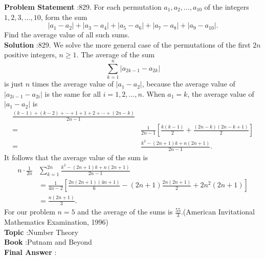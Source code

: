 \documentclass[10pt]{article}
\begin{document}
\textbf{Problem Statement} :829. For each permutation $a_{1}, a_{2}, \ldots, a_{10}$ of the integers $1,2,3, \ldots, 10$, form the sum$$ \left|a_{1}-a_{2}\right|+\left|a_{3}-a_{4}\right|+\left|a_{5}-a_{6}\right|+\left|a_{7}-a_{8}\right|+\left|a_{9}-a_{10}\right| . $$Find the average value of all such sums.\\
\textbf{Solution} :829. We solve the more general case of the permutations of the first $2 n$ positive integers, $n \geq 1$. The average of the sum$$ \sum_{k=1}^{n}\left|a_{2 k-1}-a_{2 k}\right| $$is just $n$ times the average value of $\left|a_{1}-a_{2}\right|$, because the average value of $\left|a_{2 i-1}-a_{2 i}\right|$ is the same for all $i=1,2, \ldots, n$. When $a_{1}=k$, the average value of $\left|a_{1}-a_{2}\right|$ is$$ \begin{aligned} \frac{(k-1)+(k-2)+\cdots+1+1+2+\cdots+(2 n-k)}{2 n-1} \\ =& \frac{1}{2 n-1}\left[\frac{k(k-1)}{2}+\frac{(2 n-k)(2 n-k+1)}{2}\right] \\ =& \frac{k^{2}-(2 n+1) k+n(2 n+1)}{2 n-1} . \end{aligned} $$It follows that the average value of the sum is$$ \begin{aligned} n \cdot \frac{1}{2 n} & \sum_{k=1}^{2 n} \frac{k^{2}-(2 n+1) k+n(2 n+1)}{2 n-1} \\ &=\frac{1}{4 n-2}\left[\frac{2 n(2 n+1)(4 n+1)}{6}-(2 n+1) \frac{2 n(2 n+1)}{2}+2 n^{2}(2 n+1)\right] \\ &=\frac{n(2 n+1)}{3} . \end{aligned} $$For our problem $n=5$ and the average of the sums is $\frac{55}{3}$.(American Invitational Mathematics Examination, 1996)\\
\textbf{Topic} :Number Theory\\
\textbf{Book} :Putnam and Beyond\\
\textbf{Final Answer} :\\
\end{document}
